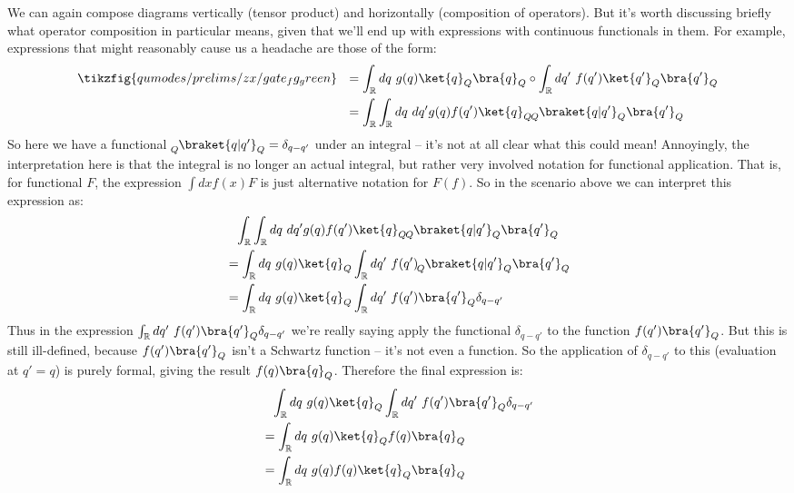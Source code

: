 We can again compose diagrams vertically (tensor product) and horizontally (composition of operators).
But it's worth discussing briefly what operator composition in particular means, given that we'll end up with expressions with continuous functionals in them.
For example, expressions that might reasonably cause us a headache are those of the form:
\begin{equation}
    \begin{aligned}
        \tikzfig{qumodes/prelims/zx/gate_fg_green}
        ~~&= \int_{\mathbb{R}} dq\ g(q) \ket{q}_Q \bra{q}_Q \circ \int_{\mathbb{R}} dq'\ f(q') \ket{q'}_Q \bra{q'}_Q \\
        &= \int_{\mathbb{R}} \int_{\mathbb{R}} dq\ dq' g(q) f(q') \ket{q}_Q \prepostsub{Q}{\braket{q|q'}}{Q} \bra{q'}_Q \\
    \end{aligned}
\end{equation}
So here we have a functional $\prepostsub{Q}{\braket{q|q'}}{Q} = \delta_{q - q'}$ under an integral -- it's not at all clear what this could mean!
Annoyingly, the interpretation here is that the integral is no longer an actual integral, but rather very involved notation for functional application.
That is, for functional $F$, the expression $\int dx f(x) F$ is just alternative notation for $F(f)$.
So in the scenario above we can interpret this expression as:
\begin{equation}
    \begin{aligned}
        &\phantom{=} \int_{\mathbb{R}} \int_{\mathbb{R}} dq\ dq' g(q) f(q') \ket{q}_Q \prepostsub{Q}{\braket{q|q'}}{Q} \bra{q'}_Q \\
        &= \int_{\mathbb{R}} dq\ g(q) \ket{q}_Q  \int_{\mathbb{R}} dq'\ f(q') \prepostsub{Q}{\braket{q|q'}}{Q} \bra{q'}_Q \\
        &= \int_{\mathbb{R}} dq\ g(q) \ket{q}_Q  \int_{\mathbb{R}} dq'\ f(q') \bra{q'}_Q \delta_{q - q'}  \\
    \end{aligned}
\end{equation}
Thus in the expression $\int_{\mathbb{R}} dq'\ f(q') \bra{q'}_Q \delta_{q - q'}$ we're really saying apply the functional $\delta_{q - q'}$ to the function $f(q') \bra{q'}_Q$.
But this is still ill-defined, because $f(q') \bra{q'}_Q$ isn't a Schwartz function -- it's not even a function.
So the application of $\delta_{q - q'}$ to this (evaluation at $q' = q$) is purely formal, giving the result $f(q) \bra{q}_Q$.
Therefore the final expression is:
\begin{equation}
    \begin{aligned}
        &\phantom{=} \int_{\mathbb{R}} dq\ g(q) \ket{q}_Q  \int_{\mathbb{R}} dq'\ f(q') \bra{q'}_Q \delta_{q - q'} \\
        &= \int_{\mathbb{R}} dq\ g(q) \ket{q}_Q  f(q) \bra{q}_Q \\
        &= \int_{\mathbb{R}} dq\ g(q) f(q) \ket{q}_Q \bra{q}_Q
    \end{aligned}
\end{equation}
